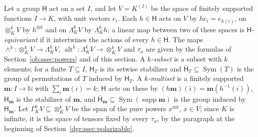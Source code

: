 \documentclass[11pt]{amsart}
\theoremstyle{definition}
\theoremstyle{remark}
\numberwithin{equation}{section}
\newcommand{\N}{\mathbb N}
\theoremstyle{plain}
\theoremstyle{definition}
\theoremstyle{plain}
\begin{document}
Let a group $\mathsf H$ act on a set $I$, and let $V=K^{(I)}$ be the space of finitely supported functions $I\to K$, with
unit vectors $e_i$. Each $h\in\mathsf H$ acts on $V$ by $he_i=e_{h(i)}$, on $\otimes^k_KV$ by $h^{\otimes k}$ and on
$\Lambda^k_KV$ by $\Lambda^k_Kh$; a linear map between two of these spaces is \emph{$\mathsf H$\nobreakdash-equivariant}
if it intertwines the actions of every $h\in\mathsf H$. The maps $\wedge^k\colon\otimes^k_KV\to\Lambda^k_KV$,
$\operatorname{alt}^k\colon\Lambda^k_KV\to\otimes^k_KV$ and $\tau_\sigma$ are given by the formulas of
Section~\ref{ob:ssec:powers} and of this section. A \emph{$k$\nobreakdash-subset} is a subset with $k$ elements; for a
finite $T\subseteq I$, $\mathsf H_T$ is its setwise stabilizer and $\bar{\mathsf H}_T\subseteq\operatorname{Sym}(T)$ is
the group of permutations of $T$ induced by $\mathsf H_T$. A \emph{$k$\nobreakdash-multiset} is a finitely supported
$\mathbf m\colon I\to\N$ with $\sum_i\mathbf m(i)=k$; $\mathsf H$ acts on these by
$(h\mathbf m)(i)=\mathbf m(h^{-1}(i))$, $\mathsf H_{\mathbf m}$ is the stabilizer of $\mathbf m$, and
$\bar{\mathsf H}_{\mathbf m}\subseteq\operatorname{Sym}(\operatorname{supp}\mathbf m)$ is the group induced by
$\mathsf H_{\mathbf m}$.
Let $\Gamma^k_KV\subseteq\otimes^k_KV$ be the span of the pure powers $x^{\otimes k}$, $x\in V$; since $K$ is infinite,
it is the space of tensors fixed by every $\tau_\sigma$, by the paragraph at the beginning of
Section~\ref{dgr:ssec:polarizable}.
\end{document}
